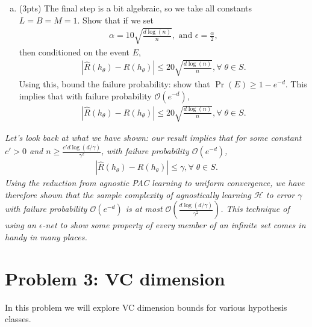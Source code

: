 \documentclass[11pt]{article}
\DeclareMathOperator{\prob}{Pr}
\newcommand{\calH}{{\mathcal{H}}}
\newcommand{\blue}[1]{{\color{blue}#1}}
\newcommand{\order}{\ensuremath{\mathcal{O}}}
\begin{document}
\begin{enumerate}[(a)]
   \item (\blue{3pts}) The final step is a bit algebraic, so we take all constants $L=B=M=1$. Show that if we set 
    \begin{align*}
        \alpha=10\sqrt{\frac{d\log(n)}{n}}, \text{ and } \epsilon=\frac{\alpha}{2},
    \end{align*}
    then conditioned on the event $E$, 
    \begin{align*}
        |\hat{R}(h_{\theta})-R(h_{\theta})| \le 20\sqrt{\frac{d\log(n)}{n}}, \forall \; \theta \in S.
    \end{align*}
    Using this, bound the failure probability: show that $\prob(E)\ge {1-e^{-d}}$. This implies that with failure probability $\order(e^{-d})$,
   \begin{align*}
        |\hat{R}(h_{\theta})-R(h_{\theta})| \le 20\sqrt{\frac{d\log(n)}{n}}, \forall \; \theta \in S.
    \end{align*}

\end{enumerate}

\emph{Let's look back at what we have shown: our result implies that for some constant $c'>0$ and $n\ge \frac{c'd\log(d/\gamma)}{\gamma^2}$, with failure probability $\order(e^{-d})$,
    \begin{align*}
        |\hat{R}(h_{\theta})-R(h_{\theta})| \le \gamma, \forall \; \theta \in S.
    \end{align*}
    Using the reduction from agnostic PAC learning to uniform convergence, we have therefore shown that the sample complexity of agnostically learning $\calH$ to error $\gamma$ with failure probability $\order(e^{-d})$ is at most $\order\left(\frac{d\log(d/\gamma)}{\gamma^2}\right)$. This technique of using an $\epsilon$-net to show some property of every member of an infinite set comes in handy in many places.}

\section*{Problem 3: VC dimension}

In this problem we will explore VC dimension bounds for various hypothesis classes.
\end{document}
